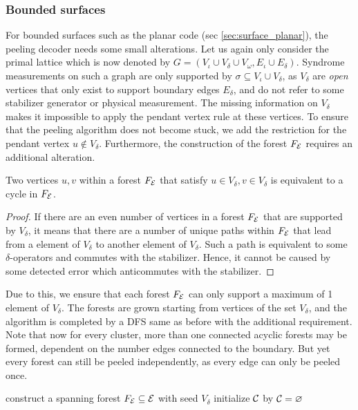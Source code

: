 \subsubsection{Bounded surfaces}
For bounded surfaces such as the planar code (sec \ref{sec:surface_planar}), the peeling decoder needs some small alterations. Let us again only consider the primal lattice which is now denoted by $G = (V_\iota\cup V_{\delta} \cup V_{\omega}, E_\iota \cup E_{\delta})$. Syndrome measurements on such a graph are only supported by $\sigma \subseteq V_\iota\cup V_\delta$, as $V_\delta$ are \emph{open} vertices that only exist to support boundary edges $E_\delta$, and do not refer to some stabilizer generator or physical measurement. The missing information on $V_\delta$ makes it impossible to apply the pendant vertex rule at these vertices. To ensure that the peeling algorithm does not become stuck, we add the restriction for the pendant vertex $u \notin V_\delta$. Furthermore, the construction of the forest $F_{\mathcal{E}}$ requires an additional alteration.
\begin{lemma}
  Two vertices $u,v$ within a forest $F_{\mathcal{E}}$ that satisfy $u\in V_\delta, v \in V_\delta$ is equivalent to a cycle in $F_{\mathcal{E}}$. 
\end{lemma}
\begin{proof}
  If there are an even number of vertices in a forest $F_{\mathcal{E}}$ that are supported by $V_\delta$, it means that there are a number of unique paths within $F_{\mathcal{E}}$ that lead from a element of $V_\delta$ to another element of $V_\delta$. Such a path is equivalent to some $\delta$-operators and commutes with the stabilizer. Hence, it cannot be caused by some detected error which anticommutes with the stabilizer.
\end{proof}
Due to this, we ensure that each forest $F_{\mathcal{E}}$ can only support a maximum of 1 element of $V_\delta$. The forests are grown starting from vertices of the set $V_\delta$, and the algorithm is completed by a DFS same as before with the additional requirement. Note that now for every cluster, more than one connected acyclic forests may be formed, dependent on the number edges connected to the boundary. But yet every forest can still be peeled independently, as every edge can only be peeled once. 

\begin{algo}[algotitle=Peeling decoder for bounded surfaces (adapted from \cite{delfosse2017linear}), label=algo:peelbound]
  \begin{algorithm}[H]
    \BlankLine
    construct a spanning forest $F_{\mathcal{E}}\subseteq\mathcal{E}$ with seed $V_\delta$\;
    initialize $\mathcal{C}$ by $\mathcal{C} = {\varnothing}$\;
  \end{algorithm}
\end{algo}



